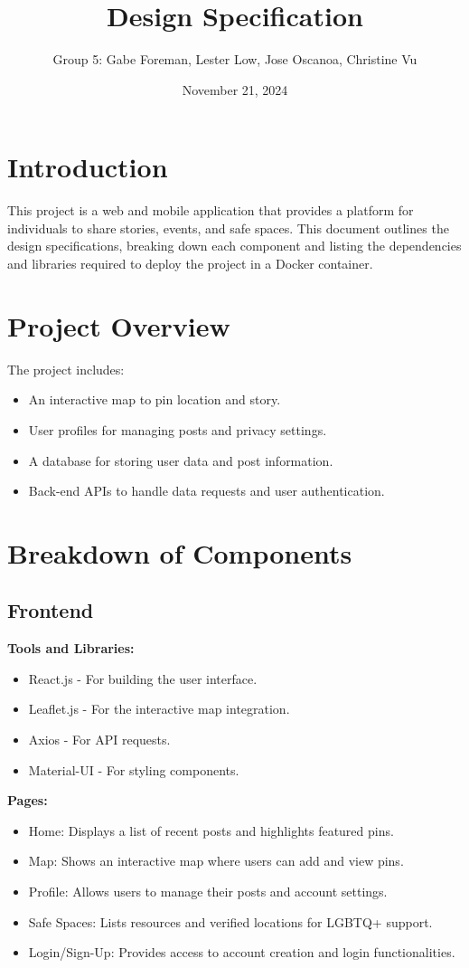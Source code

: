 \documentclass{article}
\title{Design Specification}
\author{Group 5: Gabe Foreman, Lester Low, Jose Oscanoa, Christine Vu}
\date{November 21, 2024}
\begin{document}
\maketitle
\tableofcontents
\newpage

\section{Introduction}
This project is a web and mobile application that provides a platform for individuals to share stories, events, and safe spaces. This document outlines the design specifications, breaking down each component and listing the dependencies and libraries required to deploy the project in a Docker container.

\section{Project Overview}
The project includes:
\begin{itemize}
    \item An interactive map to pin location and story.
    \item User profiles for managing posts and privacy settings.
    \item A database for storing user data and post information.
    \item Back-end APIs to handle data requests and user authentication.
\end{itemize}

\section{Breakdown of Components}

\subsection{Frontend}
\textbf{Tools and Libraries:}
\begin{itemize}
    \item React.js - For building the user interface.
    \item Leaflet.js - For the interactive map integration.
    \item Axios - For API requests.
    \item Material-UI - For styling components.
\end{itemize}

\textbf{Pages:}
\begin{itemize}
    \item Home: Displays a list of recent posts and highlights featured pins.
    \item Map: Shows an interactive map where users can add and view pins.
    \item Profile: Allows users to manage their posts and account settings.
    \item Safe Spaces: Lists resources and verified locations for LGBTQ+ support.
    \item Login/Sign-Up: Provides access to account creation and login functionalities.
\end{itemize}
\end{document}
